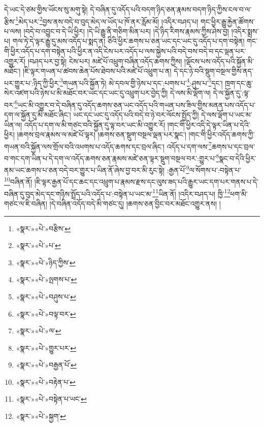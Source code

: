 དེ་ཡང་དེ་ཙམ་གྱིས་ཡོངས་སུ་མགུ་སྟེ། དེ་བཞིན་དུ་འདོད་པའི་བདག་ཉིད་ཅན་རྣམས་བདག་ཉིད་ཀྱིས་ངལ་བ་ལ་རྩིས་\footnote{«སྣར་»«པེ་»བརྩིས་}མེད་པར་\footnote{«སྣར་»«པེ་»པ་}བྱས་ནས་བདེ་བ་བུད་མེད་ལ་ཡོད་པ་ཁོ་ནར་རློམ་མོ། །འདིར་བཤད་པ། གང་ཕྱིར་རྒྱུ་རྐྱེན་ཚོགས་པ་ལས། །བདེ་བ་འབྱུང་བ་དེ་ཡི་ཕྱིར། །དེ་ཡི་རྒྱུ་ནི་གཅིག་མིན་པར། །དེ་ཉིད་རིགས་རྣམས་ཀྱིས་ཤེས་བྱ། །འདིར་སྨྲས་པ། གལ་ཏེ་དེ་ལྟར་རྒྱུ་དུ་མས་འདོད་པ་སྨད་ན། ཅིའི་ཕྱིར་ཆགས་པ་ཅན་ཡང་དང་ཡང་དུ་འདོད་པ་དག་བསྟེན། གང་གི་ཕྱིར་འདོད་པ་དག་བསྟེན་པའི་ཕྱིར་ན་འདི་ངེས་པར་འདོད་པ་ལས་སྐྱེས་པའི་བདེ་བས་བདེ་བ་དང་ལྡན་པར་འགྱུར་རོ། །བཤད་པར་བྱ་སྟེ། ངེས་པར། མཛེ་པོ་འཕྲུག་བཞིན་འདོད་ཆགས་ཀྱིས། །ལྡོངས་པས་འདོད་པའི་སྐྱོན་མི་མཐོང་། །ཇི་ལྟར་གཡན་པ་ཚབས་ཆེན་པོས་ཐེབས་པའི་མཛེ་པོ་འཕྲུག་པ་ན། དེ་དང་ཉེ་བའི་སྡུག་བསྔལ་གྱིས་ནད་པར་གྱུར་པ་:ཉིད་ཀྱི་ཕྱིར་\footnote{«སྣར་»«པེ་»ཉིད་ཀྱིས་}གཡན་པའི་སྐྱོན་ཏེ། མེ་དབལ་གྱི་ཉེས་པ་དང་:པགས་པ་\footnote{«སྣར་»«པེ་»ལྤགས་པ་}:ཤུས་པ་\footnote{«སྣར་»«པེ་»བཤུས་པ་}དང་། ཁྲག་དང་ཆུ་སེར་འཛག་པའི་ཉེས་པ་མི་མཐོང་བར་ཡང་དང་ཡང་དུ་འཕྲུག་པར་བྱེད་ཀྱི། དེ་ལས་མི་ལྡོག་ལ། དེ་ལ་སྐྱོན་དུ་:ལྟ་བར་\footnote{«སྣར་»«པེ་»བལྟ་བར་}ཡང་མི་འགྱུར་བ་དེ་བཞིན་དུ་འདོད་ཆགས་ཅན་ཡང་འདོད་པའི་གཡན་པས་ཟིལ་གྱིས་མནན་པས་འདོད་པ་དག་ལ་སྐྱོན་དུ་མི་མཐོང་ཞིང་། ཡང་དང་ཡང་དུ་འདོད་པའི་བདེ་བ་ཉེ་བར་ལོངས་སྤྱོད་ཀྱི། དེ་ལས་ལྡོག་པ་ཡང་མ་ཡིན་ལ། འདོད་པ་དག་ལ་མི་གཙང་བའི་སྐྱོན་དུ་ལྟ་བར་ཡང་མི་འགྱུར་རོ། །གང་གི་ཕྱིར་འདི་དེ་ལྟར་ཡིན་པ་དེའི་ཕྱིར། །ཆགས་བྲལ་རྣམས་ལ་མཛེ་པོ་ལྟར། །ཆགས་ཅན་སྡུག་བསྔལ་ལྡན་པར་སྣང་། །གང་གི་ཕྱིར་འདོད་ཆགས་ཀྱི་གཡན་བའི་སྐྱོན་ལས་གྲོལ་བའི་འཕགས་པ་འདོད་ཆགས་དང་བྲལ་ཞིང་། འདོད་པ་དག་ལས་\footnote{«སྣར་»«པེ་»ལ་}ཆགས་པ་དང་བྲལ་བ་གང་དག་ཡིན་པ་དེ་དག་ལ་འདོད་ཆགས་ཅན་རྣམས་མཛེ་ཅན་ལྟར་སྡུག་བསྔལ་བར་:གྱུར་པ་\footnote{«སྣར་»«པེ་»གྱུར་པར་}སྣང་བ་དེའི་ཕྱིར་ནམ་ཡང་ཆགས་པ་ཅན་བདེ་བར་གྱུར་པ་ཡིན་ནོ་ཞེས་བྱ་བར་མི་རུང་སྟེ། :རྒྱན་པོ་\footnote{«སྣར་»«པེ་»བརྒྱན་པོ་}ལ་སོགས་པ་:བསྟེན་པ་\footnote{«སྣར་»«པེ་»བརྟེན་པ་}བཞིན་ནོ། །ཇི་ལྟར་རྒྱན་པོ་དང་ཆང་དང་འཕྲུག་པ་རྣམས་རྫས་དང་ལུས་ཟད་པའི་རྒྱུར་ཡང་དག་པར་གནས་པ་དེ་བཞིན་དུ་བུད་མེད་དང་གཉིས་སྤྲོད་པའི་འདོད་པ་:བསྟེན་པ་ཡང་མ་\footnote{«སྣར་»«པེ་»བསྟེན་པ་ཡང་}ཡིན་ནོ། །འདིར་བཤད་པ། ཁྱི་\footnote{«སྣར་»«པེ་»སྐྱག་}ཕག་མི་གཙང་ལ་ཇི་བཞིན། །དེ་བཞིན་འདོད་བདེ་མི་གཙང་དུ། །ཆགས་ཅན་བྱིང་བར་མཐོང་འགྱུར་ནས། །
